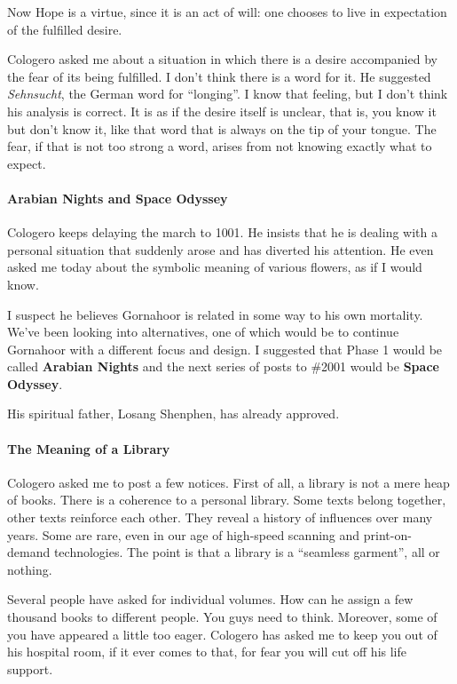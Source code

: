Now Hope is a virtue, since it is an act of will: one chooses to live in expectation of the fulfilled desire.

Cologero asked me about a situation in which there is a desire accompanied by the fear of its being fulfilled. I don't think there is a word for it. He suggested \emph{Sehnsucht}, the German word for ``longing''. I know that feeling, but I don't think his analysis is correct. It is as if the desire itself is unclear, that is, you know it but don't know it, like that word that is always on the tip of your tongue. The fear, if that is not too strong a word, arises from not knowing exactly what to expect.

\paragraph{Arabian Nights and Space Odyssey}


Cologero keeps delaying the march to 1001. He insists that he is dealing with a personal situation that suddenly arose and has diverted his attention. He even asked me today about the symbolic meaning of various flowers, as if I would know.

I suspect he believes Gornahoor is related in some way to his own mortality. We've been looking into alternatives, one of which would be to continue Gornahoor with a different focus and design. I suggested that Phase 1 would be called \textbf{Arabian Nights} and the next series of posts to \#2001 would be \textbf{Space Odyssey}.

His spiritual father, Losang Shenphen, has already approved.

\paragraph{The Meaning of a Library}


Cologero asked me to post a few notices. First of all, a library is not a mere heap of books. There is a coherence to a personal library. Some texts belong together, other texts reinforce each other. They reveal a history of influences over many years. Some are rare, even in our age of high-speed scanning and print-on-demand technologies. The point is that a library is a ``seamless garment'', all or nothing.

Several people have asked for individual volumes. How can he assign a few thousand books to different people. You guys need to think. Moreover, some of you have appeared a little too eager. Cologero has asked me to keep you out of his hospital room, if it ever comes to that, for fear you will cut off his life support.

